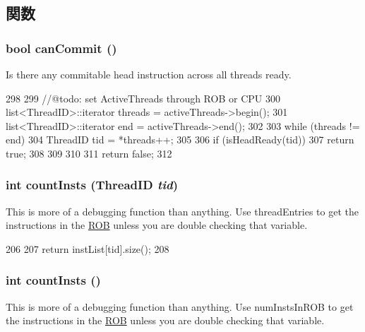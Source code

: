\subsection{関数}
\hypertarget{classROB_a47c266650f91e4f5670ea25d8e7b787b}{
\subsubsection[{canCommit}]{\setlength{\rightskip}{0pt plus 5cm}bool canCommit ()}}
\label{classROB_a47c266650f91e4f5670ea25d8e7b787b}
Is there any commitable head instruction across all threads ready. 


\begin{DoxyCode}
298 {
299     //@todo: set ActiveThreads through ROB or CPU
300     list<ThreadID>::iterator threads = activeThreads->begin();
301     list<ThreadID>::iterator end = activeThreads->end();
302 
303     while (threads != end) {
304         ThreadID tid = *threads++;
305 
306         if (isHeadReady(tid)) {
307             return true;
308         }
309     }
310 
311     return false;
312 }
\end{DoxyCode}
\hypertarget{classROB_ac7828ae51d0a8c259745a7f45410a368}{
\subsubsection[{countInsts}]{\setlength{\rightskip}{0pt plus 5cm}int countInsts ({\bf ThreadID} {\em tid})}}
\label{classROB_ac7828ae51d0a8c259745a7f45410a368}
This is more of a debugging function than anything. Use threadEntries to get the instructions in the \hyperlink{classROB}{ROB} unless you are double checking that variable. 


\begin{DoxyCode}
206 {
207     return instList[tid].size();
208 }
\end{DoxyCode}
\hypertarget{classROB_ab654970f03abd90f0c397bba8e218bc9}{
\subsubsection[{countInsts}]{\setlength{\rightskip}{0pt plus 5cm}int countInsts ()}}
\label{classROB_ab654970f03abd90f0c397bba8e218bc9}
This is more of a debugging function than anything. Use numInstsInROB to get the instructions in the \hyperlink{classROB}{ROB} unless you are double checking that variable. 


